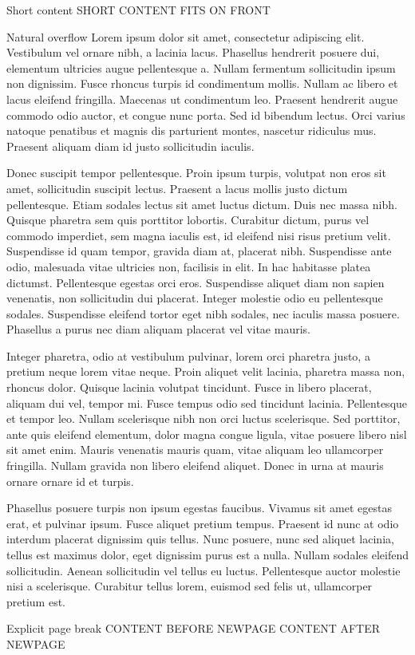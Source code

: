 \documentclass{pnpcards}
\begin{document}
\begin{card}{Short content}
    SHORT CONTENT FITS ON FRONT
\end{card}

\begin{card}{Natural overflow}
Lorem ipsum dolor sit amet, consectetur adipiscing elit. Vestibulum vel ornare nibh, a lacinia lacus. Phasellus hendrerit posuere dui, elementum ultricies augue pellentesque a. Nullam fermentum sollicitudin ipsum non dignissim. Fusce rhoncus turpis id condimentum mollis. Nullam ac libero et lacus eleifend fringilla. Maecenas ut condimentum leo. Praesent hendrerit augue commodo odio auctor, et congue nunc porta. Sed id bibendum lectus. Orci varius natoque penatibus et magnis dis parturient montes, nascetur ridiculus mus. Praesent aliquam diam id justo sollicitudin iaculis.

Donec suscipit tempor pellentesque. Proin ipsum turpis, volutpat non eros sit amet, sollicitudin suscipit lectus. Praesent a lacus mollis justo dictum pellentesque. Etiam sodales lectus sit amet luctus dictum. Duis nec massa nibh. Quisque pharetra sem quis porttitor lobortis. Curabitur dictum, purus vel commodo imperdiet, sem magna iaculis est, id eleifend nisi risus pretium velit. Suspendisse id quam tempor, gravida diam at, placerat nibh. Suspendisse ante odio, malesuada vitae ultricies non, facilisis in elit. In hac habitasse platea dictumst. Pellentesque egestas orci eros. Suspendisse aliquet diam non sapien venenatis, non sollicitudin dui placerat. Integer molestie odio eu pellentesque sodales. Suspendisse eleifend tortor eget nibh sodales, nec iaculis massa posuere. Phasellus a purus nec diam aliquam placerat vel vitae mauris.

Integer pharetra, odio at vestibulum pulvinar, lorem orci pharetra justo, a pretium neque lorem vitae neque. Proin aliquet velit lacinia, pharetra massa non, rhoncus dolor. Quisque lacinia volutpat tincidunt. Fusce in libero placerat, aliquam dui vel, tempor mi. Fusce tempus odio sed tincidunt lacinia. Pellentesque et tempor leo. Nullam scelerisque nibh non orci luctus scelerisque. Sed porttitor, ante quis eleifend elementum, dolor magna congue ligula, vitae posuere libero nisl sit amet enim. Mauris venenatis mauris quam, vitae aliquam leo ullamcorper fringilla. Nullam gravida non libero eleifend aliquet. Donec in urna at mauris ornare ornare id et turpis.

Phasellus posuere turpis non ipsum egestas faucibus. Vivamus sit amet egestas erat, et pulvinar ipsum. Fusce aliquet pretium tempus. Praesent id nunc at odio interdum placerat dignissim quis tellus. Nunc posuere, nunc sed aliquet lacinia, tellus est maximus dolor, eget dignissim purus est a nulla. Nullam sodales eleifend sollicitudin. Aenean sollicitudin vel tellus eu luctus. Pellentesque auctor molestie nisi a scelerisque. Curabitur tellus lorem, euismod sed felis ut, ullamcorper pretium est.
\end{card}

\begin{card}{Explicit page break}
    CONTENT BEFORE NEWPAGE
    \newpage
    CONTENT AFTER NEWPAGE
\end{card}
\end{document}
